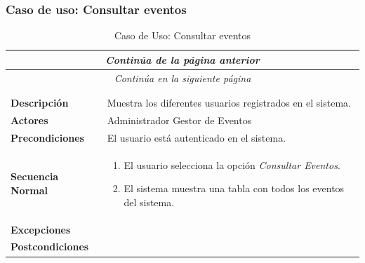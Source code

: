 \newpage
\subsubsection*{Caso de uso: Consultar eventos }
\begin{longtable}{| p{4cm} | p{10cm} |}
\endfirsthead
\multicolumn{2}{c}{\textit{Continúa de la página anterior}}\\[12pt]
\hline
\endhead
\hline
\multicolumn{2}{c}{\textit{Continúa en la siguiente página}} \\
\endfoot
\hline
\caption{Caso de Uso: Consultar eventos}\label{fig:1}\\
\endlastfoot


\hline
\multicolumn{2}{|c|}{\textbf{CU$<$37$>$ - Consultar Eventos}} \\

\hline
\textbf{Descripción} &
Muestra los diferentes usuarios registrados en el sistema.\\

\hline
\textbf{Actores} &
Administrador\newline
Gestor de Eventos\\

\hline
\textbf{Precondiciones} &
El usuario está autenticado en el sistema.\\

\hline
\textbf{Secuencia Normal} &\mbox{}\par\vspace{-\baselineskip}
\begin{enumerate}[leftmargin=0.7cm, topsep=0.1cm]
\item El usuario selecciona la opción \textit{Consultar Eventos}.
\item El sistema muestra una tabla con todos los eventos del sistema.
\end{enumerate}


\\
\hline
\textbf{Excepciones} &\mbox{}\par\vspace{-\baselineskip}
\\

\hline
\textbf{Postcondiciones} & \\
\hline
\end{longtable}



\newpage
